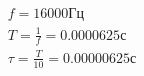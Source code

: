 \documentclass{article}
\begin{document}
\begin{gather}
	f = 16000\text{Гц}\nonumber\\
	T=\frac{1}{f}=0.0000625\text{с}\nonumber\\
	\tau=\frac{T}{10}=0.00000625\text{с}\nonumber
\end{gather}
	
\end{document}
